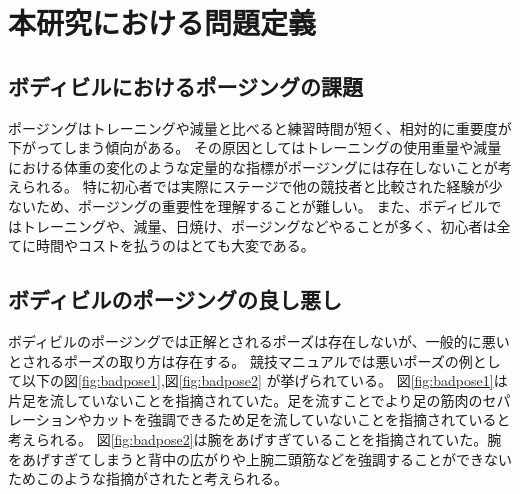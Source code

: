 \chapter{本研究における問題定義}
\label{issue}

\section{ボディビルにおけるポージングの課題}
ポージングはトレーニングや減量と比べると練習時間が短く、相対的に重要度が下がってしまう傾向がある。
その原因としてはトレーニングの使用重量や減量における体重の変化のような定量的な指標がポージングには存在しないことが考えられる。
特に初心者では実際にステージで他の競技者と比較された経験が少ないため、ポージングの重要性を理解することが難しい。
また、ボディビルではトレーニングや、減量、日焼け、ポージングなどやることが多く、初心者は全てに時間やコストを払うのはとても大変である。
\section{ボディビルのポージングの良し悪し}
ボディビルのポージングでは正解とされるポーズは存在しないが、一般的に悪いとされるポーズの取り方は存在する。
競技マニュアル\cite{JBBF2023}では悪いポーズの例として以下の図\ref{fig:badpose1},図\ref{fig:badpose2} が挙げられている。
図\ref{fig:badpose1}は片足を流していないことを指摘されていた。足を流すことでより足の筋肉のセパレーションやカットを強調できるため足を流していないことを指摘されていると考えられる。
図\ref{fig:badpose2}は腕をあげすぎていることを指摘されていた。腕をあげすぎてしまうと背中の広がりや上腕二頭筋などを強調することができないためこのような指摘がされたと考えられる。

